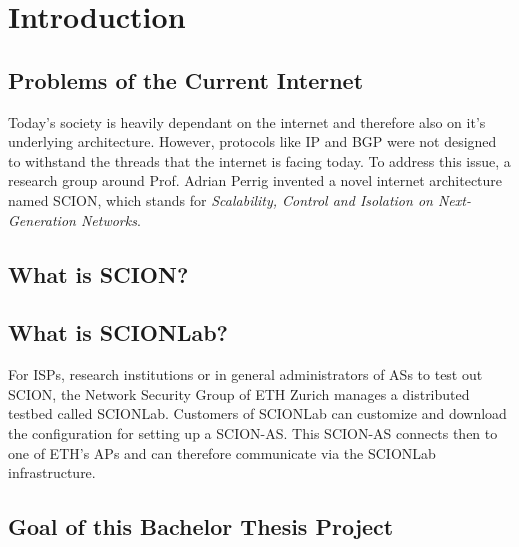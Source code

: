 \chapter{Introduction}

\section{Problems of the Current Internet}
Today's society is heavily dependant on the internet and therefore also on it's underlying architecture. However, protocols like \ac{IP} and \ac{BGP} were not designed to withstand the threads that the internet is facing today. To address this issue, a research group around Prof. Adrian Perrig invented a novel internet architecture named \acs{SCION}, which stands for \textit{Scalability, Control and Isolation on Next-Generation Networks}.

\section{What is SCION?}

\section{What is SCIONLab?}

For \acp{ISP}, research institutions or in general administrators of \acp{AS} to test out \acs{SCION}, the Network Security Group of \acs{ETH} Zurich manages a distributed testbed called \acs{SCIONLab}. Customers of \acs{SCIONLab} can customize and download the configuration for setting up a \acs{SCION}-\ac{AS}. This \acs{SCION}-\ac{AS} connects then to one of \acs{ETH}'s \aclp{AP} and can therefore communicate  via the \acs{SCIONLab} infrastructure.

\section{Goal of this Bachelor Thesis Project}

